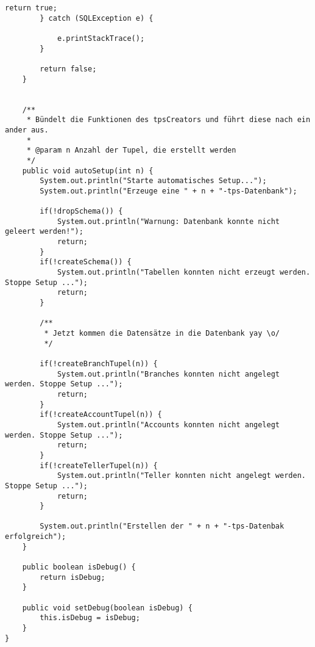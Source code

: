 \begin{lstlisting}[caption={TpsCreatorOldStatements (optimiert)}, label={lst:tpsoldv2}]
			return true;
		} catch (SQLException e) {

			e.printStackTrace();
		}
		
		return false;
	}
	
	
	/**
	 * Bündelt die Funktionen des tpsCreators und führt diese nach ein ander aus.
	 * 
	 * @param n Anzahl der Tupel, die erstellt werden
	 */
	public void autoSetup(int n) {
		System.out.println("Starte automatisches Setup...");
		System.out.println("Erzeuge eine " + n + "-tps-Datenbank");
		
		if(!dropSchema()) {
			System.out.println("Warnung: Datenbank konnte nicht geleert werden!");
			return;
		}
		if(!createSchema()) {
			System.out.println("Tabellen konnten nicht erzeugt werden. Stoppe Setup ...");
			return;
		}
		
		/**
		 * Jetzt kommen die Datensätze in die Datenbank yay \o/
		 */
		
		if(!createBranchTupel(n)) {
			System.out.println("Branches konnten nicht angelegt werden. Stoppe Setup ...");
			return;
		}
		if(!createAccountTupel(n)) {
			System.out.println("Accounts konnten nicht angelegt werden. Stoppe Setup ...");
			return;
		}
		if(!createTellerTupel(n)) {
			System.out.println("Teller konnten nicht angelegt werden. Stoppe Setup ...");
			return;
		}
		
		System.out.println("Erstellen der " + n + "-tps-Datenbak erfolgreich");
	}

	public boolean isDebug() {
		return isDebug;
	}

	public void setDebug(boolean isDebug) {
		this.isDebug = isDebug;
	}
}
\end{lstlisting}
